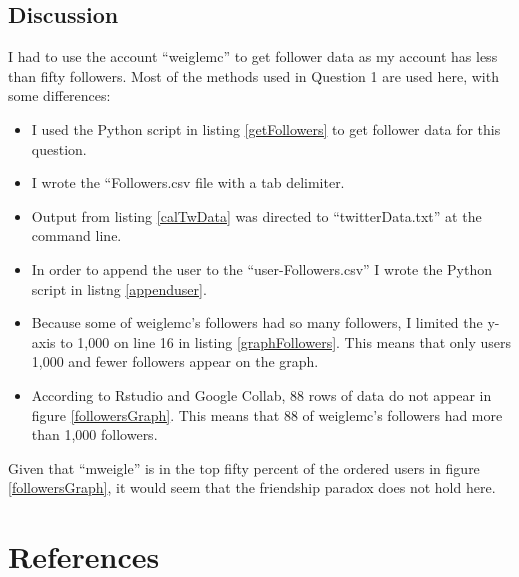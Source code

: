 \documentclass[12pt]{article}
\begin{document}
\subsection*{Discussion}
I had to use the account ``weiglemc'' to get follower data as my account has less than fifty followers.  Most of the methods used in Question 1 are used here, with some differences:

\begin{itemize}
    \item I used the Python script in listing \ref{getFollowers} to get follower data for this question.
    \item I wrote the ``Followers.csv file with a tab delimiter.
    \item Output from listing \ref{calTwData} was directed to ``twitterData.txt'' at the command line.
    \item In order to append the user to the ``user-Followers.csv'' I wrote the Python script in listng \ref{appenduser}.
    \item Because some of weiglemc's followers had so many followers, I limited the y-axis to 1,000 on line 16 in listing \ref{graphFollowers}.  This means that only users 1,000 and fewer followers appear on the graph.
    \item According to Rstudio and Google Collab, 88 rows of data do not appear in figure \ref{followersGraph}.  This means that 88 of weiglemc's followers had more than 1,000 followers.
\end{itemize}

Given that ``mweigle'' is in the top fifty percent of the ordered users in figure \ref{followersGraph}, it would seem that the friendship paradox does not hold here.


\section*{References}
\end{document}
